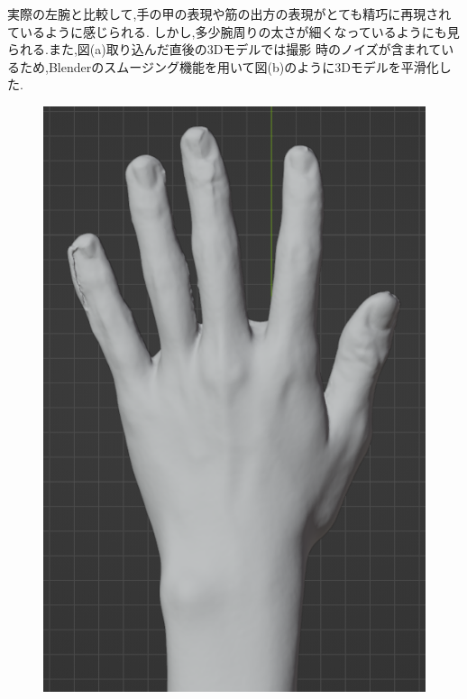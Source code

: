 \documentclass{ltjsreport}
\begin{document}
		\vspace{-15pt}

		実際の左腕と比較して,手の甲の表現や筋の出方の表現がとても精巧に再現されているように感じられる.
		しかし,多少腕周りの太さが細くなっているようにも見られる.また,図(a)取り込んだ直後の3Dモデルでは撮影
		時のノイズが含まれているため,Blenderのスムージング機能を用いて図(b)のように3Dモデルを平滑化した.

		\begin{figure}[H]
		\centering
		\begin{minipage}{0.3\columnwidth}
		\centering
		\includegraphics[width = \columnwidth]{../figs/SmoothingBeforRear.png}
		\label{fig:smoothingbefor}
		\end{minipage}

\end{figure}
\end{document}
